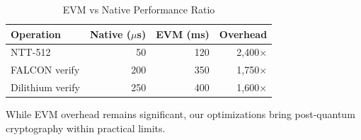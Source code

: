 \begin{table}[h]
\centering
\caption{EVM vs Native Performance Ratio}
\begin{tabular}{lrrr}
\toprule
Operation & Native ($\mu$s) & EVM (ms) & Overhead \\
\midrule
NTT-512 & 50 & 120 & 2,400× \\
FALCON verify & 200 & 350 & 1,750× \\
Dilithium verify & 250 & 400 & 1,600× \\
\bottomrule
\end{tabular}
\end{table}

While EVM overhead remains significant, our optimizations bring post-quantum cryptography within practical limits.

